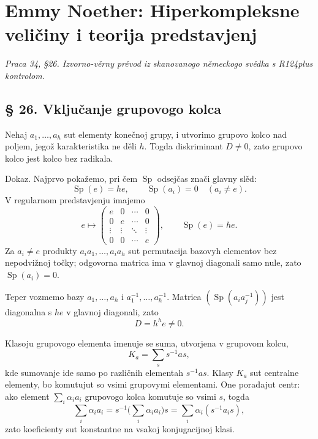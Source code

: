 \documentclass[11pt]{article}
\begin{document}
\section*{Emmy Noether: Hiperkompleksne veličiny i teorija predstavjenj}
\emph{Praca 34, §26. Izvorno-věrny prěvod iz skanovanogo německogo svědka s R124plus kontrolom.}

\subsection*{§ 26. Vključanje grupovogo kolca}

Nehaj $a_1,\ldots,a_h$ sut elementy konečnoj grupy, i utvorimo grupovo kolco nad poljem, jegož karakteristika ne děli $h$. Togda diskriminant $D\ne0$, zato grupovo kolco jest kolco bez radikala.

Dokaz. Najprvo pokažemo, pri čem $\operatorname{Sp}$ odsejčas znači glavny slěd:
\[
        \operatorname{Sp}(e)=he,
        \qquad
        \operatorname{Sp}(a_i)=0\quad(a_i\ne e).
\]
V regularnom predstavjenju imajemo
\[
        e\mapsto
        \begin{pmatrix}
        e&0&\cdots&0\\
        0&e&\cdots&0\\
        \vdots&\vdots&\ddots&\vdots\\
        0&0&\cdots&e
        \end{pmatrix},
        \qquad \operatorname{Sp}(e)=he.
\]
Za $a_i\ne e$ produkty $a_i a_1,\ldots,a_i a_h$ sut permutacija bazovyh elementov bez nepodvižnoj točky; odgovorna matrica ima v glavnoj diagonali samo nule, zato $\operatorname{Sp}(a_i)=0$.

Teper vozmemo bazy $a_1,\ldots,a_h$ i $a_1^{-1},\ldots,a_h^{-1}$. Matrica $(\operatorname{Sp}(a_i a_j^{-1}))$ jest diagonalna s $he$ v glavnoj diagonali, zato
\[
        D=h^h e\ne0.
\]

Klasoju grupovogo elementa imenuje se suma, utvorjena v grupovom kolcu,
\[
        K_a=\sum_s s^{-1}as,                         \tag{1}
\]
kde sumovanje ide samo po različnih elementah $s^{-1}as$. Klasy $K_a$ sut centralne elementy, bo komutujut so vsimi grupovymi elementami. One porađajut centr: ako element $\sum_i\alpha_i a_i$ grupovogo kolca komutuje so vsimi $s$, togda
\[
        \sum_i\alpha_i a_i=s^{-1}\biggl(\sum_i\alpha_i a_i\biggr)s
        =\sum_i\alpha_i(s^{-1}a_i s),
\]
zato koeficienty sut konstantne na vsakoj konjugacijnoj klasi.
\end{document}
